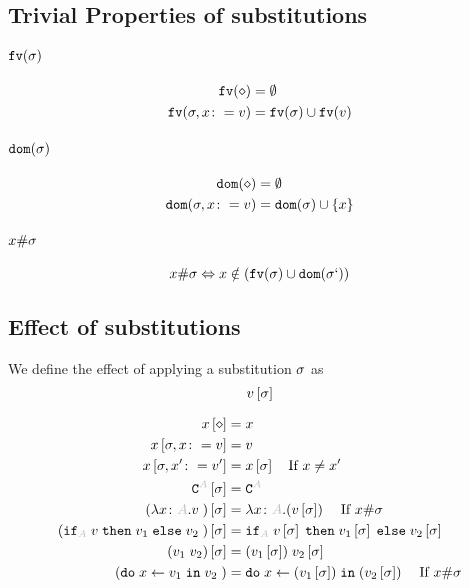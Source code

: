 \documentclass{report}
\begin{document}
\subsection{Trivial Properties of substitutions}
\paragraph{$\texttt{fv}(\sigma)$}
\begin{align*}
    \texttt{fv}(\diamond) &= \emptyset\\
    \texttt{fv}(\sigma, x\colon= v) &= \texttt{fv}(\sigma)\cup\texttt{fv}(v)
\end{align*}
\paragraph{$\texttt{dom}(\sigma)$}
\begin{align*}
    \texttt{dom}(\diamond) & = \emptyset\\
    \texttt{dom}(\sigma, x\colon= v) & = \texttt{dom}(\sigma)\cup\left\{x\right\}
\end{align*}

\paragraph{$x \# \sigma$}
\begin{equation}
    x \# \sigma \Leftrightarrow x\notin(\texttt{fv}(\sigma)\cup\texttt{dom}(\sigma`))
\end{equation}

\subsection{Effect of substitutions}
    We define the effect of applying a substitution $\sigma$ as 
    $$v\left[\sigma\right]$$

    
    \begin{align*}
        x\sub{\nil} & = x \\
        x\sub{\si,x\setto v} & = v \\
        x\sub{\si,x'\setto v'} & = x\ssi\qt{If }x \neq x'\\
        \const{A}\ssi & = \const{A} \\
        (\lam{x}{A}{v})\ssi &= \lam{x}{A}{(v\ssi)}\qt{If }x\#\si\\
        (\pifthenelse{A}{v}{v_1}{v_2})\ssi &= \pifthenelse{A}{v\ssi}{v_1\ssi}{v_2\ssi}\\
        (\apply{v_1}{v_2})\ssi&= \apply{(v_1\ssi)}{v_2\ssi}\\
        (\doin{x}{v_1}{v_2})&= \doin{x}{(v_1\ssi)}{(v_2\ssi)}\qt{If } x\#\si\\
    \end{align*}
\end{document}
